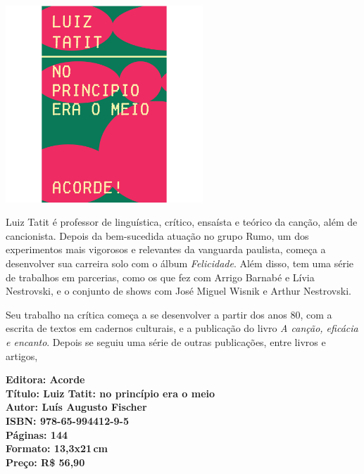 \pagestyle{acorde}
\label{acorde}

\begin{center}
\hspace*{.5cm}\includegraphics[width=74mm]{./CAPAS/ACORDE_TATIT.jpg}
\end{center}
\hspace*{-7cm}\hrulefill\hspace*{-7cm}
\medskip

\noindent{}Luiz Tatit é professor de linguística, crítico, ensaísta e teórico da canção, além de cancionista. Depois da bem-sucedida atuação no grupo Rumo, um dos experimentos mais vigorosos e relevantes da vanguarda paulista, começa a desenvolver sua carreira solo com o álbum \textit{Felicidade}. Além disso, tem uma série de trabalhos em parcerias, como os que fez com Arrigo Barnabé e Lívia Nestrovski, e o conjunto de shows com José Miguel Wisnik e Arthur Nestrovski.

Seu trabalho na crítica começa a se desenvolver a partir dos anos 80, com a escrita de textos em cadernos culturais, e a publicação do livro \textit{A canção, eficácia e encanto}. Depois se seguiu uma série de outras publicações, entre livros e artigos, 

\vfill
\hspace*{-.4cm}\begin{minipage}[c]{.5\linewidth}
\small\textbf{
\hspace*{-.1cm}Editora: Acorde\\
Título: Luiz Tatit: no princípio era o meio\\
Autor: Luís Augusto Fischer\\ 
ISBN: 978-65-994412-9-5\\
Páginas: 144\\
Formato: 13,3x21\,cm\\
Preço: R\$ 56,90\\
}
\end{minipage}
\pagebreak

